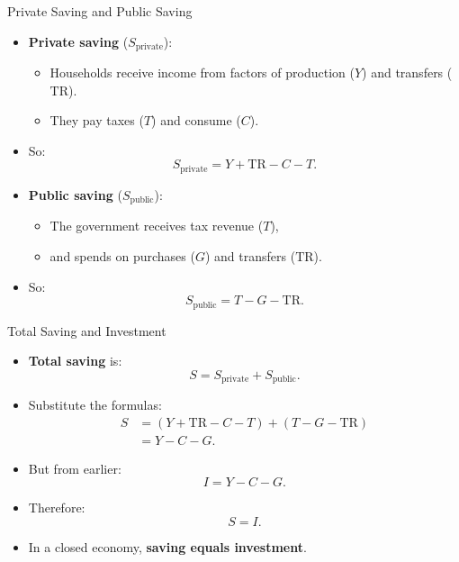 \documentclass[aspectratio=169]{beamer}
\begin{document}
\begin{frame}{Private Saving and Public Saving}
\transfade
\begin{itemize}
  \item \textbf{Private saving} (\(S_{\text{private}}\)):
  \begin{itemize}
    \item Households receive income from factors of production (\(Y\)) and transfers (\(\text{TR}\)).
    \item They pay taxes (\(T\)) and consume (\(C\)).
  \end{itemize}
  \item So:
  \[
    S_{\text{private}} = Y + \text{TR} - C - T.
  \]
  \item \textbf{Public saving} (\(S_{\text{public}}\)):
  \begin{itemize}
    \item The government receives tax revenue (\(T\)),
    \item and spends on purchases (\(G\)) and transfers (\(\text{TR}\)).
  \end{itemize}
  \item So:
  \[
    S_{\text{public}} = T - G - \text{TR}.
  \]
\end{itemize}
\end{frame}

\begin{frame}{Total Saving and Investment}
\transfade
\begin{itemize}
  \item \textbf{Total saving} is:
  \[
    S = S_{\text{private}} + S_{\text{public}}.
  \]
  \item Substitute the formulas:
  \begin{align*}
    S &= (Y + \text{TR} - C - T) + (T - G - \text{TR}) \\
      &= Y - C - G.
  \end{align*}
  \item But from earlier:
  \[
    I = Y - C - G.
  \]
  \item Therefore:
  \[
    S = I.
  \]
  \item In a closed economy, \textbf{saving equals investment}.
\end{itemize}
\end{frame}
\end{document}
